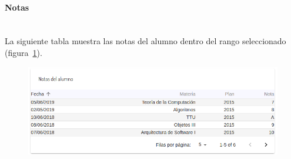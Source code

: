 \paragraph{Notas} \mbox{}\\
La siguiente tabla muestra las notas del alumno dentro del rango seleccionado (figura~\ref{fig:sa-notas}).

\begin{figure}[H]
  \centering
    \includegraphics[scale=0.4]{images/seguimiento-academico/sa-notas.png}
  \label{fig:sa-notas}
\end{figure}

